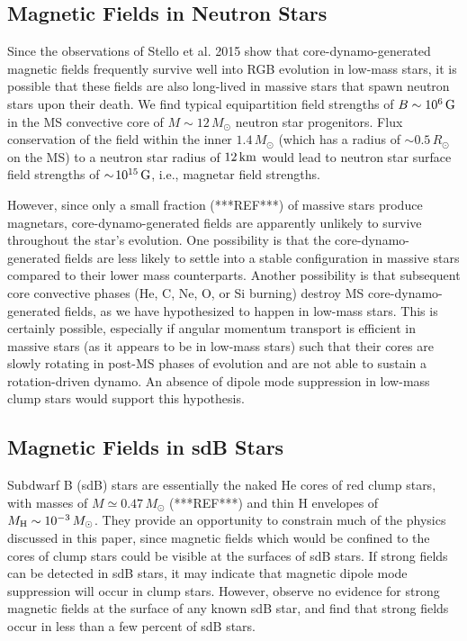 \subsection{Magnetic Fields in Neutron Stars}

Since the observations of Stello et al. 2015 show that core-dynamo-generated magnetic fields frequently survive well into RGB evolution in low-mass stars, it is possible that these fields are also long-lived in massive stars that spawn neutron stars upon their death. We find typical equipartition field strengths of $B \sim 10^6 \, {\rm G}$ in the MS convective core of $M \sim 12 \, M_\odot$ neutron star progenitors. Flux conservation of the field within the inner $1.4 \, M_\odot$ (which has a radius of $\sim \! 0.5 \, R_\odot$ on the MS) to a neutron star radius of $12 \, {\rm km}$ would lead to neutron star surface field strengths of $\sim \! 10^{15} \, {\rm G}$, i.e., magnetar field strengths.  

However, since only a small fraction (***REF***) of massive stars produce magnetars, core-dynamo-generated fields are apparently unlikely to survive throughout the star's evolution. One possibility is that the core-dynamo-generated fields are less likely to settle into a stable configuration in massive stars compared to their lower mass counterparts. Another possibility is that subsequent core convective phases (He, C, Ne, O, or Si burning) destroy MS core-dynamo-generated fields, as we have hypothesized to happen in low-mass stars. This is certainly possible, especially if angular momentum transport is efficient in massive stars (as it appears to be in low-mass stars) such that their cores are slowly rotating in post-MS phases of evolution and are not able to sustain a rotation-driven dynamo. An absence of dipole mode suppression in low-mass clump stars would support this hypothesis. 


\subsection{Magnetic Fields in sdB Stars}

Subdwarf B (sdB) stars are essentially the naked He cores of red clump stars, with masses of $M \simeq 0.47 \, M_\odot$ (***REF***) and thin H envelopes of $M_{\rm H} \sim 10^{-3} \, M_\odot$. They provide an opportunity to constrain much of the physics discussed in this paper, since magnetic fields which would be confined to the cores of clump stars could be visible at the surfaces of sdB stars. If strong fields can be detected in sdB stars, it may indicate that magnetic dipole mode suppression will occur in clump stars. However, \cite{Landstreet_2012} observe no evidence for strong magnetic fields at the surface of any known sdB star, and find that strong fields occur in less than a few percent of sdB stars. 

